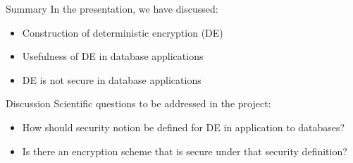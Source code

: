\documentclass{beamer}
\begin{document}
\begin{frame}{Summary}
In the presentation, we have discussed:
\begin{itemize}
\item Construction of deterministic encryption (DE)
\item Usefulness of DE in database applications
\item DE is not secure in database applications
\end{itemize}
\end{frame}


\begin{frame}{Discussion}
Scientific questions to be addressed in the project:
\begin{itemize}
\item How should security notion be defined for DE in application to databases?
\item Is there an encryption scheme that is secure under that security definition?
\end{itemize}
\end{frame}
\end{document}
